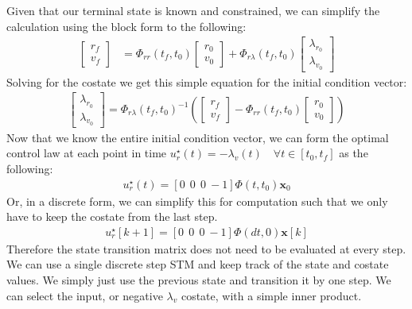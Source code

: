 \documentclass[conf]{new-aiaa}
\begin{document}
\begin{singlespace}
Given that our terminal state is known and constrained, we can simplify the calculation using the block form to the following:
\begin{align}
    \begin{bmatrix}
        r_f \\ v_f
    \end{bmatrix}
    &= \Phi_{rr}(t_f,t_0)
    \begin{bmatrix}
        r_0 \\ v_0
    \end{bmatrix}
    +
    \Phi_{r\lambda}(t_f,t_0)
    \begin{bmatrix}
        \lambda_{r_0} \\ \lambda_{v_0}
    \end{bmatrix}
\end{align}
%
Solving for the costate we get this simple equation for the initial condition vector:
\begin{align}
    \begin{bmatrix}
        \lambda_{r_0} \\ \lambda_{v_0}
    \end{bmatrix}
    = \Phi_{r\lambda}(t_f,t_0)^{-1}
    \left(
    \begin{bmatrix}
        r_f\\v_f
    \end{bmatrix}
    -
    \Phi_{rr}(t_f,t_0)
    \begin{bmatrix}
        r_0\\v_0
    \end{bmatrix}\right)
\end{align}
Now that we know the entire initial condition vector, we can form the optimal control law at each point in time $u_r^\star(t) = -\lambda_v(t) \quad \forall t \in [t_0, t_f]$ as the following:
    \begin{align}
        u_r^\star(t) = [0 \ \ 0 \ \ 0 \ -1]\Phi(t,t_0)\bm{x}_0
    \end{align}
Or, in a discrete form, we can simplify this for computation such that we only have to keep the costate from the last step.
\begin{align}
    u_r^\star[k+1] = [0 \ \ 0 \ \ 0 \ -1]\Phi(dt,0)\bm{x}[k]
\end{align}
Therefore the state transition matrix does not need to be evaluated at every step. We can use a single discrete step STM and keep track of the state and costate values. We simply just use the previous state and transition it by one step. We can select the input, or negative $\lambda_v$ costate, with a simple inner product.


\end{singlespace}
\end{document}
